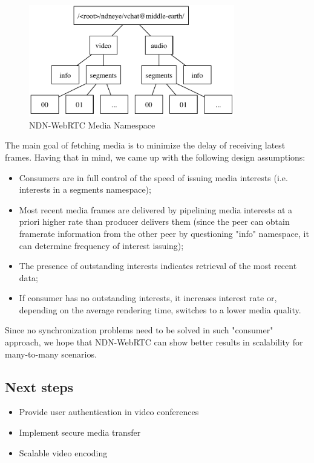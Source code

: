 \documentclass[12pt]{article}
\begin{document}
\begin{figure}
\centering
\includegraphics[width=0.8\textwidth]{../res/graphics/namespace-v01}
\caption{NDN-WebRTC Media Namespace}
\label{media-ns}
\end{figure}

The main goal of fetching media is to minimize the delay of receiving latest frames. Having that in mind, we came up with the following design assumptions:

\begin{itemize}
\item Consumers are in full control of the speed of issuing media interests (i.e. interests in a segments namespace);
\item Most recent media frames are delivered by pipelining media interests at a priori higher rate than producer delivers them (since the peer can obtain framerate information from the other peer by questioning "info" namespace, it can determine frequency of interest issuing);
\item The presence of outstanding interests indicates retrieval of the most recent data;
\item If consumer has no outstanding interests, it increases interest rate or, depending on the average rendering time, switches to a lower media quality. 
\end{itemize} 

Since no synchronization problems need to be solved in such "consumer" approach, we hope that NDN-WebRTC can show better results in scalability for many-to-many scenarios.

\subsection{Next steps}
\begin{itemize}
\item Provide user authentication in video conferences
\item Implement secure media transfer
\item Scalable video encoding
\end{itemize}
\end{document}
